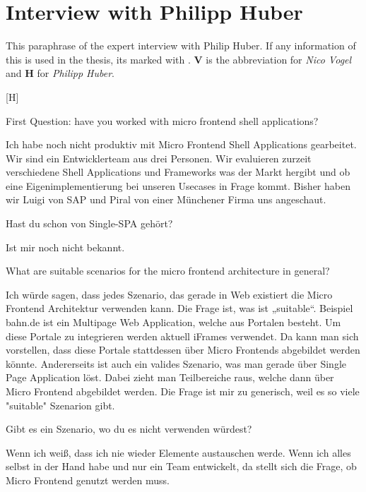 
\section{Interview with Philipp Huber}

This paraphrase of the expert interview with Philip Huber.
If any information of this is used in the thesis, its marked with \cite{Vogel.2020.Huber}.
\textbf{V} is the abbreviation for \textit{Nico Vogel} and \textbf{H} for \textit{Philipp Huber}.

[H]

\begin{description}
    \NicoVogel First Question: have you worked with micro frontend shell applications?

    \PhilippHuber Ich habe noch nicht produktiv mit Micro Frontend Shell Applications gearbeitet. Wir sind ein Entwicklerteam aus drei Personen. Wir evaluieren zurzeit verschiedene Shell Applications und Frameworks was der Markt hergibt und ob eine Eigenimplementierung bei unseren Usecases in Frage kommt. Bisher haben wir Luigi von SAP und Piral von einer Münchener Firma uns angeschaut.

    \NicoVogel Hast du schon von Single-SPA gehört?

    \PhilippHuber Ist mir noch nicht bekannt.

    \NicoVogel What are suitable scenarios for the micro frontend architecture in general?

    \PhilippHuber Ich würde sagen, dass jedes Szenario, das gerade in Web existiert die Micro Frontend Architektur verwenden kann. Die Frage ist, was ist „suitable“. Beispiel bahn.de ist ein Multipage Web Application, welche aus Portalen besteht. Um diese Portale zu integrieren werden aktuell iFrames verwendet. Da kann man sich vorstellen, dass diese Portale stattdessen über Micro Frontends abgebildet werden könnte. Andererseits ist auch ein valides Szenario, was man gerade über Single Page Application löst. Dabei zieht man Teilbereiche raus, welche dann über Micro Frontend abgebildet werden. Die Frage ist mir zu generisch, weil es so viele "suitable" Szenarion gibt.

    \NicoVogel Gibt es ein Szenario, wo du es nicht verwenden würdest?

    \PhilippHuber Wenn ich weiß, dass ich nie wieder Elemente austauschen werde. Wenn ich alles selbst in der Hand habe und nur ein Team entwickelt, da stellt sich die Frage, ob Micro Frontend genutzt werden muss.


\end{description}
